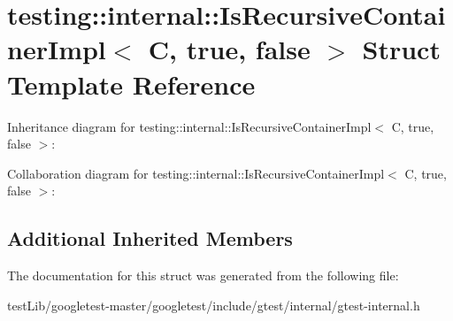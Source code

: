\hypertarget{structtesting_1_1internal_1_1IsRecursiveContainerImpl_3_01C_00_01true_00_01false_01_4}{}\section{testing\+:\+:internal\+:\+:Is\+Recursive\+Container\+Impl$<$ C, true, false $>$ Struct Template Reference}
\label{structtesting_1_1internal_1_1IsRecursiveContainerImpl_3_01C_00_01true_00_01false_01_4}


Inheritance diagram for testing\+:\+:internal\+:\+:Is\+Recursive\+Container\+Impl$<$ C, true, false $>$\+:


Collaboration diagram for testing\+:\+:internal\+:\+:Is\+Recursive\+Container\+Impl$<$ C, true, false $>$\+:
\subsection*{Additional Inherited Members}


The documentation for this struct was generated from the following file\+:\begin{DoxyCompactItemize}
\item 
test\+Lib/googletest-\/master/googletest/include/gtest/internal/gtest-\/internal.\+h\end{DoxyCompactItemize}
